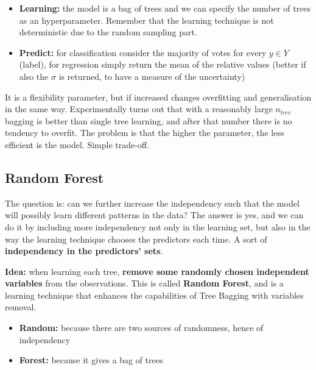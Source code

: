 \begin{definitionblock}
    \begin{itemize}
        \item \textbf{Learning:} the model is a bag of trees and we can specify the number of trees as an hyperparameter. Remember that the learning technique is not deterministic due to the random sampling part.
        \item \textbf{Predict:} for classification consider the majority of votes for every $y \in Y$ (label), for regression simply return the mean of the relative values (better if also the $\sigma$ is returned, to have a measure of the uncertainty)
    \end{itemize}
\end{definitionblock}

\begin{warningblock}
    It is a flexibility parameter, but if increased changes overfitting and generalisation in the same way. Experimentally turns out 
    that with a reasonably large $n_{tree}$ bagging is better than single tree learning, and after that number there is no tendency to overfit.
    The problem is that the higher the parameter, the less efficient is the model. Simple trade-off.
\end{warningblock}

\subsection{Random Forest}

The question is: can we further increase the independency such that the model will possibly learn different patterns in the data? The answer is yes, and we can do it by including more independency not only in the learning set, but also in the way the learning technique chooses the predictors each time. A sort of \textbf{independency in the predictors' sets}.

\textbf{Idea:} when learning each tree, \textbf{remove some randomly chosen independent variables} from the observations. This is called \textbf{Random Forest}, and is a learning technique that enhances the capabilities of Tree Bagging with variables removal.
\begin{itemize}
    \item \textbf{Random:} because there are two sources of randomness, hence of independency
    \item \textbf{Forest:} because it gives a bag of trees 
\end{itemize}


